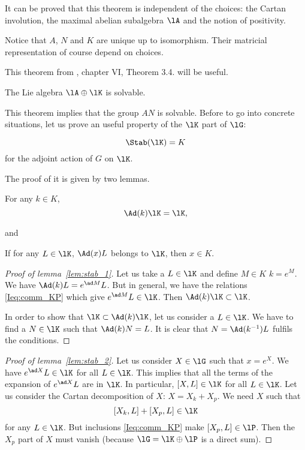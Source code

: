 \begin{remark}
	It can be proved that this theorem is independent of the choices: the Cartan involution, the maximal abelian subalgebra $\lA$ and the notion of positivity.
\end{remark}
Notice that $A$, $N$ and $K$ are unique up to isomorphism. Their matricial representation of course depend on choices.

This theorem from \cite{Helgason}, chapter VI, Theorem 3.4. will be useful.

\begin{theorem}
	The Lie algebra $\lA\oplus\lK$ is solvable.
\end{theorem}
This theorem implies that the group $AN$ is solvable. Before to go into concrete situations, let us prove an useful property of the $\lK$ part of $\lG$:

\begin{theorem}
	\[
		\Stab(\lK)=K
	\]
	for the adjoint action of $G$ on $\lK$.
	\label{tho:Stab_K}
\end{theorem}
The proof of it is given by two lemmas. \cite{Humphreys}

\begin{lemma}
	For any $k\in K$,
	\[
		\Ad(k)\lK=\lK,
	\]
	\label{lem:stab_1}
\end{lemma}
and
\begin{lemma}
	If for any $L\in\lK$, $\Ad(x)L$ belongs to $\lK$, then $x\in K$.
	\label{lem:stab_2}
\end{lemma}

\begin{proof}[Proof of lemma~\ref{lem:stab_1}]
	Let us take a $L\in\lK$ and define $M\in K$ $k=e^M$. We have $\Ad(k)L=e^{\ad M}L$. But in general, we have the relations \eqref{Ieq:comm_KP} which give $e^{\ad M}L\in\lK$. Then $\Ad(k)\lK\subset\lK$.

	In order to show that $\lK\subset\Ad(k)\lK$, let us consider a $L\in\lK$. We have to find a $N\in\lK$ such that $\Ad(k)N=L$. It is clear that $N=\Ad(k^{-1})L$ fulfils the conditions.
\end{proof}

\begin{proof}[Proof of lemma~\ref{lem:stab_2}]
	Let us consider $X\in\lG$ such that $x=e^X$. We have $e^{\ad X}L\in\lK$ for all $L\in\lK$. This implies that all the terms of the expansion of $e^{\ad X}L$ are in $\lK$. In particular, $[X,L]\in\lK$ for all $L\in\lK$. Let us consider the Cartan decomposition of $X$: $X=X_k+X_p$. We need $X$ such that
	\[
		[X_k,L]+[X_p,L]\in\lK
	\]
	for any $L\in\lK$. But inclusions \eqref{Ieq:comm_KP} make $[X_p,L]\in\lP$. Then the $X_p$ part of $X$ must vanish (because $\lG=\lK\oplus\lP$ is a direct sum).
\end{proof}

